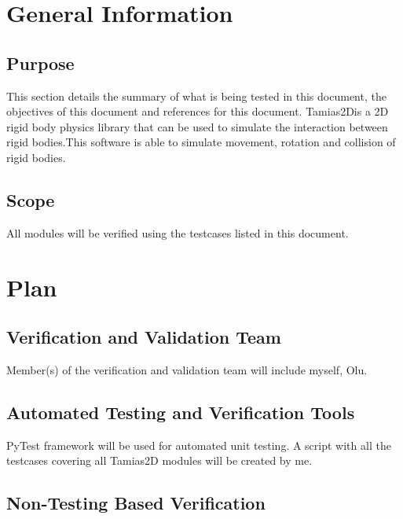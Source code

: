 \documentclass[12pt, titlepage]{article}
\newcommand{\progname}{Tamias2D}
\begin{document}

\section{General Information}
\subsection{Purpose}

This section details the summary of what is being tested in this document, the
objectives of this document and references for this document. \progname is a 2D
rigid body physics library that can be used to simulate the interaction between
rigid bodies.This software is able to simulate movement, rotation and collision
of rigid bodies.

\subsection{Scope}

All modules will be verified using the testcases listed in this document.

\section{Plan}
	
\subsection{Verification and Validation Team}

Member(s) of the verification and validation team will include myself, Olu.

\subsection{Automated Testing and Verification Tools}

PyTest framework will be used for automated unit testing. A script with all the
testcases covering all \progname{} modules will be created by me.

\subsection{Non-Testing Based Verification}
\end{document}
